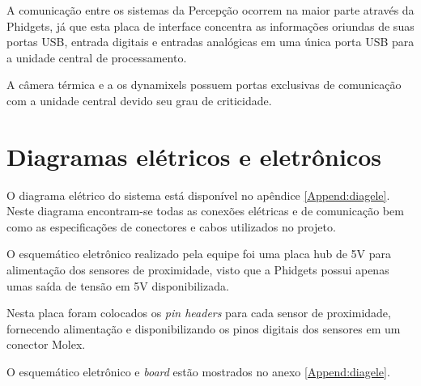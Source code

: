 	A comunicação entre os sistemas da Percepção ocorrem na maior parte  através da Phidgets, já que esta placa de interface concentra as informações oriundas de suas portas USB, entrada digitais e entradas analógicas em uma única porta USB para a unidade central de processamento.
	
	A câmera térmica e a os dynamixels possuem portas exclusivas de comunicação com a unidade central devido seu grau de criticidade.
	
	\section{Diagramas elétricos e eletrônicos}
	\label{sec:diage}
	O diagrama elétrico do sistema está disponível no apêndice \ref{Append:diagele}. Neste diagrama encontram-se todas as conexões elétricas e de comunicação bem como as especificações de conectores e cabos utilizados no projeto.
	
	O esquemático eletrônico realizado pela equipe foi uma placa hub de 5V para alimentação dos sensores de proximidade, visto que a Phidgets possui apenas umas saída de tensão em 5V disponibilizada.
	
	Nesta placa foram colocados os \textit{pin headers} para cada sensor de proximidade, fornecendo alimentação e disponibilizando os pinos digitais dos sensores em um conector Molex.
	
	O esquemático eletrônico e \textit{board} estão mostrados no anexo \ref{Append:diagele}.

